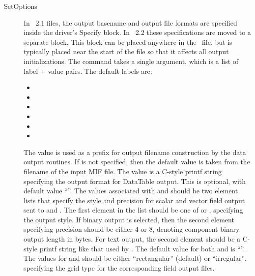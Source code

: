 \begin{description}
\item[SetOptions\label{html:mif2SetOptions}]
In \MIF~2.1 files, the output basename and output file formats are
specified inside the driver's Specify block.  In \MIF~2.2 these
specifications are moved to a separate  block.  This
block can be placed anywhere in the \MIF\ file, but is typically placed
near the start of the file so that it affects all output
initializations.  The  command takes a single argument,
which is a list of label + value pairs.  The default labels are:
\begin{itemize}
\item {}
\item {}
\item {}
\item {}
\item {}
\item {}
\end{itemize}
The  value is used as a prefix for output filename
construction by the data output routines.  If  is not
specified, then the default value is taken from the filename of the
input MIF file.  The  value is a C-style
printf string specifying
the output format for DataTable output.  This is
optional, with default value ``''.  The values associated with
 and
 should be two element lists
that specify the style and precision for scalar and vector field
output sent to  and
.  The first
element in the list should be one of  or , specifying
the output style.  If binary output is selected, then the second element
specifying precision should be either 4 or 8, denoting component binary
output length in bytes.  For text output, the
second element should be a C-style printf string like that used by
.  The default value for both
 and
 is ``''.
The values for  and
 should be either ``rectangular''
(default) or ``irregular'', specifying the grid type for the
corresponding field output files.


\end{description}

